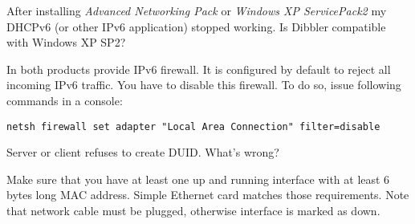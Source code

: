 \Q After installing \emph{Advanced Networking Pack} or \emph{Windows XP
  ServicePack2} my DHCPv6 (or other IPv6 application) stopped
   working. Is Dibbler compatible with Windows XP SP2?

\A In both products provide IPv6 firewall. It
is configured by default to reject all incoming IPv6 traffic. You have
to disable this firewall. To do so, issue following commands in a
console:

\begin{verbatim}
netsh firewall set adapter "Local Area Connection" filter=disable
\end{verbatim}

\Q Server or client refuses to create DUID. What's wrong?

\A Make sure that you have at least one up and running interface with
at least 6 bytes long MAC address. Simple Ethernet card matches those
requirements. Note that network cable must be plugged, otherwise
interface is marked as down.
